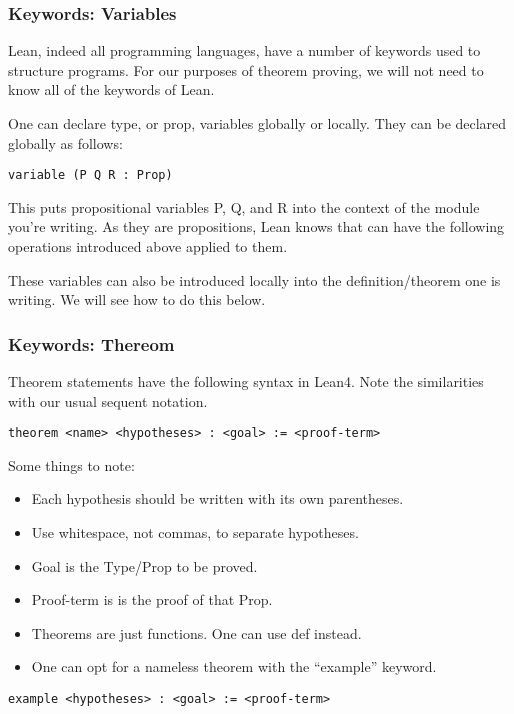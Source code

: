 \documentclass{beamer}
\theoremstyle{indentDefn} \newtheorem{defn}[]{Definition}
\begin{document}
\begin{frame}[fragile]
\frametitle{Keywords: Variables}

Lean, indeed all programming languages, have a number of keywords used to structure programs. For our purposes of theorem proving, we will not need to know all of the keywords of Lean. 

One can declare type, or prop, variables globally or locally. They can be declared globally as follows: 

\begin{lstlisting}
variable (P Q R : Prop)
\end{lstlisting}

This puts propositional variables P, Q, and R into the context of the module you're writing. As they are propositions, Lean knows that can have the following operations introduced above applied to them.

These variables can also be introduced locally into the definition/theorem one is writing. We will see how to do this below.

\end{frame}

\begin{frame}[fragile]
	\frametitle{Keywords: Thereom}

Theorem statements have the following syntax in Lean4. Note the similarities with our usual sequent notation.

\vspace{5mm}

\small{
\begin{lstlisting}
theorem <name> <hypotheses> : <goal> := <proof-term>
\end{lstlisting}	}

Some things to note: 
\begin{itemize}
	\item Each hypothesis should be written with its own parentheses. 
	\item Use whitespace, not commas, to separate hypotheses.
	\item Goal is the Type/Prop to be proved.
	\item Proof-term is is the proof of that Prop.
	\item Theorems are just functions. One can use def instead.
	\item One can opt for a nameless theorem with the ``example'' keyword. 
\end{itemize}

\small{
\begin{lstlisting}
example <hypotheses> : <goal> := <proof-term>
\end{lstlisting}	}



\end{frame}
\end{document}
